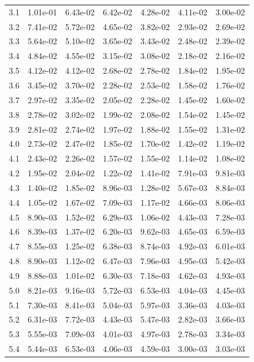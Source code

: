 \begin{table}[h!]
{\begin{tabular}{|c|c|c|c|c|c|c|}
3.1 & 1.01e-01 & 6.43e-02 & 6.42e-02 & 4.28e-02 & 4.11e-02 & 3.00e-02\\
3.2 & 7.41e-02 & 5.72e-02 & 4.65e-02 & 3.82e-02 & 2.93e-02 & 2.69e-02\\
3.3 & 5.64e-02 & 5.10e-02 & 3.65e-02 & 3.43e-02 & 2.48e-02 & 2.39e-02\\
3.4 & 4.84e-02 & 4.55e-02 & 3.15e-02 & 3.08e-02 & 2.18e-02 & 2.16e-02\\
3.5 & 4.12e-02 & 4.12e-02 & 2.68e-02 & 2.78e-02 & 1.84e-02 & 1.95e-02\\
3.6 & 3.45e-02 & 3.70e-02 & 2.28e-02 & 2.53e-02 & 1.58e-02 & 1.76e-02\\
3.7 & 2.97e-02 & 3.35e-02 & 2.05e-02 & 2.28e-02 & 1.45e-02 & 1.60e-02\\
3.8 & 2.78e-02 & 3.02e-02 & 1.99e-02 & 2.08e-02 & 1.54e-02 & 1.45e-02\\
3.9 & 2.81e-02 & 2.74e-02 & 1.97e-02 & 1.88e-02 & 1.55e-02 & 1.31e-02\\
4.0 & 2.73e-02 & 2.47e-02 & 1.85e-02 & 1.70e-02 & 1.42e-02 & 1.19e-02\\
4.1 & 2.43e-02 & 2.26e-02 & 1.57e-02 & 1.55e-02 & 1.14e-02 & 1.08e-02\\
4.2 & 1.95e-02 & 2.04e-02 & 1.22e-02 & 1.41e-02 & 7.91e-03 & 9.81e-03\\
4.3 & 1.40e-02 & 1.85e-02 & 8.96e-03 & 1.28e-02 & 5.67e-03 & 8.84e-03\\
4.4 & 1.05e-02 & 1.67e-02 & 7.09e-03 & 1.17e-02 & 4.66e-03 & 8.06e-03\\
4.5 & 8.90e-03 & 1.52e-02 & 6.29e-03 & 1.06e-02 & 4.43e-03 & 7.28e-03\\
4.6 & 8.39e-03 & 1.37e-02 & 6.20e-03 & 9.62e-03 & 4.65e-03 & 6.59e-03\\
4.7 & 8.55e-03 & 1.25e-02 & 6.38e-03 & 8.74e-03 & 4.92e-03 & 6.01e-03\\
4.8 & 8.90e-03 & 1.12e-02 & 6.47e-03 & 7.96e-03 & 4.95e-03 & 5.42e-03\\
4.9 & 8.88e-03 & 1.01e-02 & 6.30e-03 & 7.18e-03 & 4.62e-03 & 4.93e-03\\
5.0 & 8.21e-03 & 9.16e-03 & 5.72e-03 & 6.53e-03 & 4.04e-03 & 4.45e-03\\
5.1 & 7.30e-03 & 8.41e-03 & 5.04e-03 & 5.97e-03 & 3.36e-03 & 4.03e-03\\
5.2 & 6.31e-03 & 7.72e-03 & 4.43e-03 & 5.47e-03 & 2.82e-03 & 3.66e-03\\
5.3 & 5.55e-03 & 7.09e-03 & 4.01e-03 & 4.97e-03 & 2.78e-03 & 3.34e-03\\
5.4 & 5.44e-03 & 6.53e-03 & 4.06e-03 & 4.59e-03 & 3.00e-03 & 3.03e-03\\

\end{tabular}}
\end{table}
